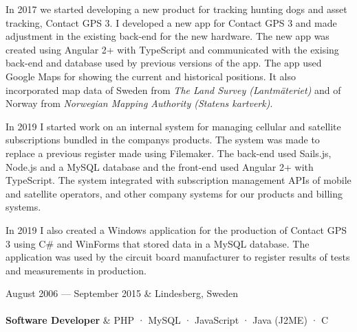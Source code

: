 \documentclass{cv-stylish}
\begin{document}
\begin{center}
\begin{adjustwidth}{0.015\linewidth}{0.015\linewidth}
In 2017 we started developing a new product for tracking hunting dogs
and asset tracking, Contact GPS 3.
I developed a new app for Contact GPS 3 and made adjustment in the
existing back-end for the new hardware. The new app was
created using Angular 2+ with TypeScript and communicated with the
exising back-end and database used by previous versions of the app.
The app used Google Maps for showing the current and historical
positions. It also incorporated map data of Sweden from \emph{The Land
  Survey (Lantmäteriet)} and of Norway from \emph{Norwegian Mapping
  Authority (Statens kartverk)}.

In 2019 I started work on an internal system for managing cellular and
satellite subscriptions bundled in the companys products. The system
was made to replace a previous register made using Filemaker. The
back-end used Sails.js, Node.js and a MySQL database and the front-end
used Angular 2+ with TypeScript.
The system integrated with subscription management APIs of mobile and
satellite operators, and other company systems for our products and
billing systems.

In 2019 I also created a Windows application for the production of
Contact GPS 3 using C\# and WinForms that stored data in a MySQL
database.
The application was used by the circuit board manufacturer to register
results of tests and measurements in production.

\end{adjustwidth}

\vspace{1em}
\pagebreak
\begin{JobTable}
  August 2006 --- September 2015 & \hfill Lindesberg, Sweden \\[3pt]
   \\[3pt]
  \hspace{5mm} \textbf{Software Developer}
  & \hfill PHP · MySQL · JavaScript · Java (J2ME) · C \\
\end{JobTable}
\begin{adjustwidth}{0.015\linewidth}{0.015\linewidth}


\end{adjustwidth}
\end{center}
\end{document}
